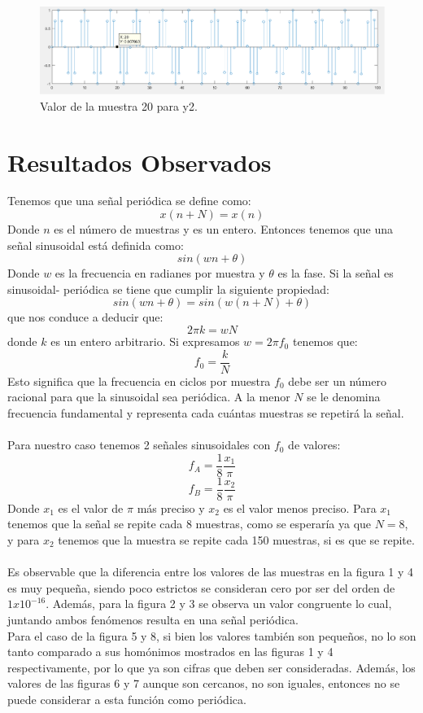 \documentclass[12pt]{article}
\begin{document}
\begin{figure}[h]
    \centering
        \includegraphics[width=15cm]{IMAGENES/T1_val8.png}
        \caption{Valor de la muestra 20 para y2.}
\end{figure}
\vspace{1mm}

\section{Resultados Observados}
Tenemos que una señal periódica se define como:
$$x(n+N)=x(n)$$
Donde $n$ es el número de muestras y es un entero. Entonces tenemos que una señal sinusoidal está definida como:
$$sin(wn+\theta)$$
Donde $w$ es la frecuencia en radianes por muestra y $\theta$ es la fase. Si la señal es sinusoidal-
periódica se tiene que cumplir la siguiente propiedad:
$$sin(wn+\theta)=sin(w(n+N)+\theta)$$
que nos conduce a deducir que:
$$2\pi k=wN$$
donde $k$ es un entero arbitrario. Si expresamos $w=2\pi f_0$ tenemos que:
$$f_0=\frac{k}{N}$$
Esto significa que la frecuencia en ciclos por muestra $f_0$ debe ser un número racional para que la sinusoidal sea periódica.
A la menor $N$ se le denomina frecuencia fundamental y representa cada cuántas muestras se repetirá la señal.\\\\
Para nuestro caso tenemos 2 señales sinusoidales con $f_0$ de valores:
$$f_A=\frac{1}{8}\frac{x_1}{\pi}$$
$$f_B=\frac{1}{8}\frac{x_2}{\pi}$$
Donde $x_1$ es el valor de $\pi$ más preciso y $x_2$ es el valor menos preciso. Para $x_1$ tenemos que la señal se repite cada 8 muestras, como se esperaría ya que $N=8$, y para $x_2$ tenemos que la muestra se repite cada 150 muestras, si es que se repite.
\\\\
Es observable que la diferencia entre los valores de las muestras en la figura 1 y 4 es muy pequeña, siendo poco estrictos se consideran cero por ser del orden de $1x10^{-16}$. Además, para la figura 2 y 3 se observa un valor congruente lo cual, juntando ambos fenómenos resulta en una señal periódica.
\\
Para el caso de la figura 5 y 8, si bien los valores también son pequeños, no lo son tanto comparado a sus homónimos mostrados en las figuras 1 y 4 respectivamente, por lo que ya son cifras que deben ser consideradas. Además, los valores de las figuras 6 y 7 aunque son cercanos, no son iguales, entonces no se puede considerar a esta función como periódica.
\end{document}

